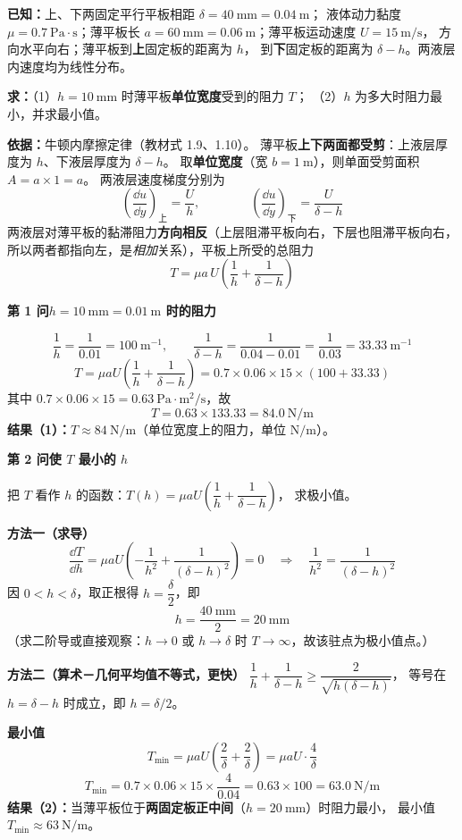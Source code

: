 \begin{jie}
\textbf{已知：}上、下两固定平行平板相距 $\delta=40\ \mathrm{mm}=0.04\ \mathrm{m}$；
液体动力黏度 $\mu=0.7\ \mathrm{Pa\cdot s}$；薄平板长
$a=60\ \mathrm{mm}=0.06\ \mathrm{m}$；薄平板运动速度 $U=15\ \mathrm{m/s}$，
方向水平向右；薄平板到\textbf{上}固定板的距离为 $h$，
到\textbf{下}固定板的距离为 $\delta-h$。两液层内速度均为线性分布。

\textbf{求：}（1）$h=10\ \mathrm{mm}$ 时薄平板\textbf{单位宽度}受到的阻力 $T$；
（2）$h$ 为多大时阻力最小，并求最小值。

\textbf{依据：}牛顿内摩擦定律（教材式 1.9、1.10）。
薄平板\textbf{上下两面都受剪}：上液层厚度为 $h$、下液层厚度为 $\delta-h$。
取\textbf{单位宽度}（宽 $b=1\ \mathrm{m}$），则单面受剪面积 $A=a\times1=a$。
两液层速度梯度分别为
\[ \left(\frac{\dd u}{\dd y}\right)_{\text{上}}=\frac{U}{h},\qquad\qquad
   \left(\frac{\dd u}{\dd y}\right)_{\text{下}}=\frac{U}{\delta-h} \]
两液层对薄平板的黏滞阻力\textbf{方向相反}（上层阻滞平板向右，下层也阻滞平板向右，
所以两者都指向左，是\emph{相加}关系），平板上所受的总阻力
\[ T=\mu a\,U\left(\frac{1}{h}+\frac{1}{\delta-h}\right) \]

\textbf{第 1 问\quad $h=10\ \mathrm{mm}=0.01\ \mathrm{m}$ 时的阻力}

\[ \frac{1}{h}=\frac{1}{0.01}=100\ \mathrm{m^{-1}},\qquad
   \frac{1}{\delta-h}=\frac{1}{0.04-0.01}=\frac{1}{0.03}=33.33\ \mathrm{m^{-1}} \]
\[ T=\mu a U\left(\frac{1}{h}+\frac{1}{\delta-h}\right)
   =0.7\times0.06\times15\times(100+33.33) \]
其中 $0.7\times0.06\times15=0.63\ \mathrm{Pa\cdot m^2/s}$，故
\[ T=0.63\times133.33=84.0\ \mathrm{N/m} \]
\textbf{结果（1）：}$T\approx84\ \mathrm{N/m}$（单位宽度上的阻力，单位 $\mathrm{N/m}$）。

\textbf{第 2 问\quad 使 $T$ 最小的 $h$}

把 $T$ 看作 $h$ 的函数：$T(h)=\mu a U\left(\dfrac{1}{h}+\dfrac{1}{\delta-h}\right)$，
求极小值。

\textbf{方法一（求导）}
\[ \frac{\dd T}{\dd h}=\mu a U\left(-\frac{1}{h^2}+\frac{1}{(\delta-h)^2}\right)=0
   \quad\Longrightarrow\quad \frac{1}{h^2}=\frac{1}{(\delta-h)^2} \]
因 $0<h<\delta$，取正根得 $h=\dfrac{\delta}{2}$，即
\[ h=\frac{40\ \mathrm{mm}}{2}=20\ \mathrm{mm} \]
（求二阶导或直接观察：$h\to0$ 或 $h\to\delta$ 时 $T\to\infty$，故该驻点为极小值点。）

\textbf{方法二（算术－几何平均值不等式，更快）}
$\dfrac{1}{h}+\dfrac{1}{\delta-h}\ge\dfrac{2}{\sqrt{h(\delta-h)}}$，
等号在 $h=\delta-h$ 时成立，即 $h=\delta/2$。

\textbf{最小值}
\[ T_{\min}=\mu a U\left(\frac{2}{\delta}+\frac{2}{\delta}\right)
   =\mu a U\cdot\frac{4}{\delta} \]
\[ T_{\min}=0.7\times0.06\times15\times\frac{4}{0.04}
   =0.63\times100=63.0\ \mathrm{N/m} \]
\textbf{结果（2）：}当薄平板位于\textbf{两固定板正中间}（$h=20\ \mathrm{mm}$）时阻力最小，
最小值 $T_{\min}\approx63\ \mathrm{N/m}$。
\end{jie}

